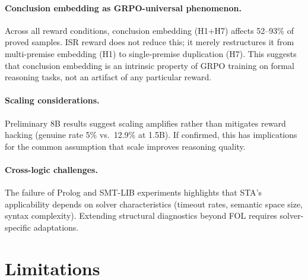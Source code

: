 \documentclass[11pt,a4paper]{article}
\newcommand{\STA}{\textsc{STA}}
\newcommand{\GRPO}{\textsc{GRPO}}
\begin{document}
\paragraph{Conclusion embedding as GRPO-universal phenomenon.} Across all reward conditions, conclusion embedding (H1+H7) affects 52--93\% of proved samples. ISR reward does not reduce this; it merely restructures it from multi-premise embedding (H1) to single-premise duplication (H7). This suggests that conclusion embedding is an intrinsic property of \GRPO{} training on formal reasoning tasks, not an artifact of any particular reward.

\paragraph{Scaling considerations.} Preliminary 8B results suggest scaling amplifies rather than mitigates reward hacking (genuine rate 5\% vs.\ 12.9\% at 1.5B). If confirmed, this has implications for the common assumption that scale improves reasoning quality.

\paragraph{Cross-logic challenges.} The failure of Prolog and SMT-LIB experiments highlights that \STA{}'s applicability depends on solver characteristics (timeout rates, semantic space size, syntax complexity). Extending structural diagnostics beyond FOL requires solver-specific adaptations.

\section{Limitations}
\end{document}
